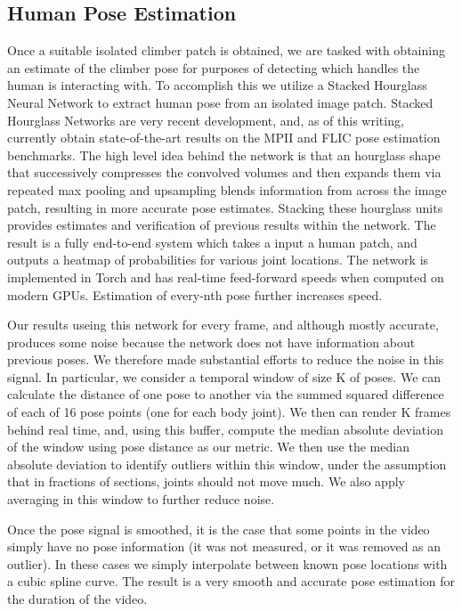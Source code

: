 \documentclass{chi2009}
\begin{document}
\subsection{Human Pose Estimation}

Once a suitable isolated climber patch is obtained, we are tasked with obtaining an estimate of the climber pose for purposes of detecting which handles the human is interacting with. To accomplish this we utilize a Stacked Hourglass Neural Network to extract human pose from an isolated image patch. Stacked Hourglass Networks are very recent development, and, as of this writing, currently obtain state-of-the-art results on the MPII and FLIC pose estimation benchmarks. The high level idea behind the network is that an hourglass shape that successively compresses the convolved volumes and then expands them via repeated max pooling and upsampling blends information from across the image patch, resulting in more accurate pose estimates. Stacking these hourglass units provides estimates and verification of previous results within the network. The result is a fully end-to-end system which takes a input a human patch, and outputs a heatmap of probabilities for various joint locations. The network is implemented in Torch and has real-time feed-forward speeds when computed on modern GPUs. Estimation of every-nth pose further increases speed.

Our results useing this network for every frame, and although mostly accurate, produces some noise because the network does not have information about previous poses. We therefore made substantial efforts to reduce the noise in this signal. In particular, we consider a temporal 
window of size K of poses. We can calculate the distance of one pose to another via the summed squared difference of each of 16 pose points (one for each body joint). We then can render K frames behind real time, and, using this buffer, compute the median absolute deviation of the window using pose distance as our metric. We then use the median absolute deviation to identify outliers within this window, under the assumption that in fractions of sections, joints should not move much. We also apply averaging in this window to further reduce noise.

Once the pose signal is smoothed, it is the case that some points in the video simply have no pose information (it was not measured, or it was removed as an outlier). In these cases we simply interpolate between known pose locations with a cubic spline curve. The result is a very smooth and accurate pose estimation for the duration of the video.
\end{document}
